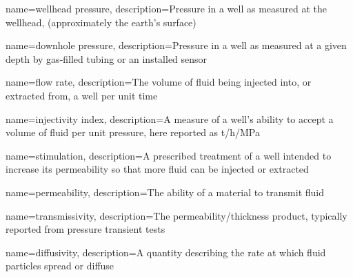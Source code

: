  








{
    name=wellhead pressure,
    description={Pressure in a well as measured at the wellhead, (approximately the earth's surface)}
}
 
{
    name=downhole pressure,
    description={Pressure in a well as measured at a given depth by gas-filled tubing or an installed sensor}
}

{
    name=flow rate,
    description={The volume of fluid being injected into, or extracted from, a well per unit time}
}

{
    name=injectivity index,
    description={A measure of a well's ability to accept a volume of fluid per unit pressure, here reported as t/h/MPa}
}

{
    name=stimulation,
    description={A prescribed treatment of a well intended to increase its permeability so that more fluid can be injected or extracted}
}

{
    name=permeability,
    description={The ability of a material to transmit fluid}
}

{
    name=transmissivity,
    description={The permeability\slash{thickness} product, typically reported from pressure transient tests}
}

{
    name=diffusivity,
    description={A quantity describing the rate at which fluid particles spread or diffuse}
}
